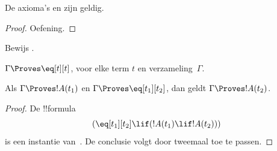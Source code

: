 \documentclass[openany]{memoir}
\begin{document}
\begin{prop}
  De axioma's  en  zijn geldig.
\end{prop}

\begin{proof}
  Oefening.
\end{proof}

\begin{prob}
Bewijs .
\end{prob}

\begin{prop}
 $\Gamma \Proves \eq[t][t]$, voor elke term $t$ en
 verzameling~$\Gamma$.
\end{prop}

\begin{prop}
  Als $\Gamma \Proves !A(t_1)$ en $\Gamma \Proves
  \eq[t_1][t_2]$, dan geldt $\Gamma \Proves !A(t_2)$.
\end{prop}

\begin{proof}
De !!{formula}
\[
(\eq[t_1][t_2] \lif (!A(t_1) \lif !A(t_2)))
\]
is een instantie van~. De conclusie volgt door
\MP{} tweemaal toe te passen.
\end{proof}
\endgroup
\OLEndChapterHook

\begingroup
\def\olfilename{OLP-0126}
\def\olfilepath{content/first-order-logic/completeness/}
\hypertarget{unit-OLP-0126}{}



      {}
      {}











\endgroup
\end{document}
